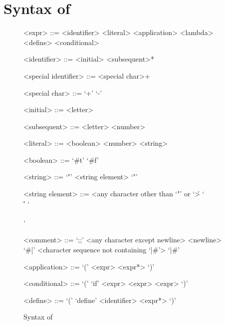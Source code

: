 \section{Syntax of \rad}

\setlength{\grammarindent}{5em}
\begin{figure}[H]
\begin{center}
\begin{grammar}
<expr> ::= <identifier>
\alt <literal>
\alt <application>
\alt <lambda>
\alt <define>
\alt <conditional>

<identifier> ::= <initial> <subsequent>*

<special identifier> ::= <special char>+

<special char> ::= `+' \alt `-' 

<initial> ::= <letter> 

<subsequent> ::= <letter> \alt <number> 

<literal> ::= <boolean>
\alt <number>
\alt <string>

<boolean> ::= `#t' \alt `#f'

<string> ::= `"' <string element> `"'

<string element> ::= <any character other than `"' or `\'>
\alt `\\\"'
\alt `\\\\'

<comment> ::= `;;' <any character except newline> <newline>
\alt `#|' <character sequence not containing `|#'> `|#'

<application> ::= `(' <expr> <expr*> `)'

<conditional> ::= `(' `if' <expr> <expr> <expr> `)'


<define> ::= `(' `define' <identifier> <expr*> `)'
\end{grammar}
\end{center}
\caption{Syntax of \rad}
\end{figure}
